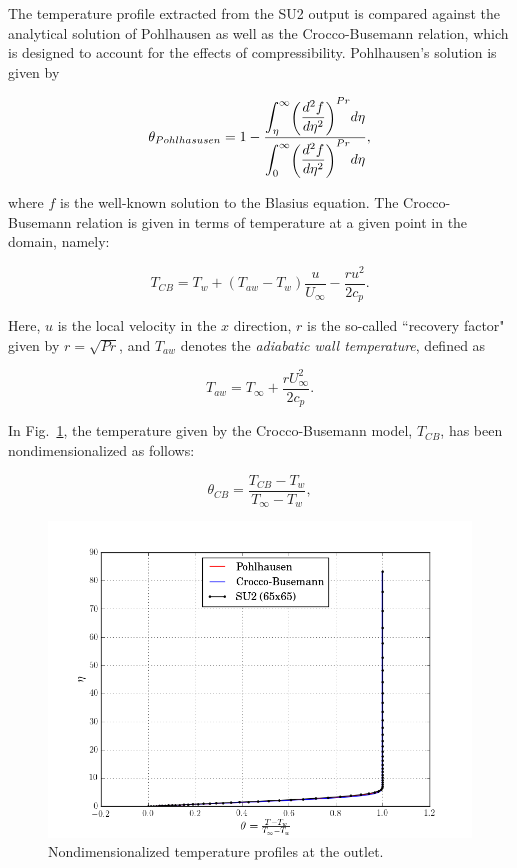 \documentclass[12pt,letterpaper]{article}
\begin{document}
The temperature profile extracted from the SU2 output is compared against the analytical solution of Pohlhausen as well as the Crocco-Busemann relation, which is designed to account for the effects of compressibility. Pohlhausen's solution is given by

\begin{equation*}
\theta_{Pohlhasusen} = 1 - \dfrac{\mathlarger{\int_{\eta}^{\infty}}\mathsmaller{\left( \dfrac{d^2f}{d\eta^2}\right)}^{Pr}d\eta}{\mathlarger{\int_{0}^{\infty}}\mathsmaller{\left( \dfrac{d^2f}{d\eta^2}\right)}^{Pr}d\eta},
\end{equation*}

where $f$ is the well-known solution to the Blasius equation. The Crocco-Busemann relation is given in terms of temperature at a given point in the domain, namely:

\begin{equation*}
T_{CB} = T_w + \left( T_{aw}-T_w \right)\frac{u}{U_\infty} - \dfrac{ru^2}{2c_p}.
\end{equation*}

Here, $u$ is the local velocity in the $x$ direction, $r$ is the so-called ``recovery factor" given by $r = \sqrt{Pr}$, and $T_{aw}$ denotes the \textit{adiabatic wall temperature}, defined as

\begin{equation*}
T_{aw} = T_\infty + \dfrac{rU_\infty^2}{2c_p}.
\end{equation*}

In Fig.~\ref{fig:temp}, the temperature given by the Crocco-Busemann model, $T_{CB}$, has been nondimensionalized as follows:

\begin{equation*}
\theta_{CB} = \dfrac{T_{CB}-T_w}{T_\infty-T_w},
\end{equation*}

\begin{figure}[h] 
\centering
\includegraphics[width=\linewidth]{temp_350.png}
\caption{Nondimensionalized temperature profiles at the outlet.}
\label{fig:temp}
\end{figure}
\end{document}
